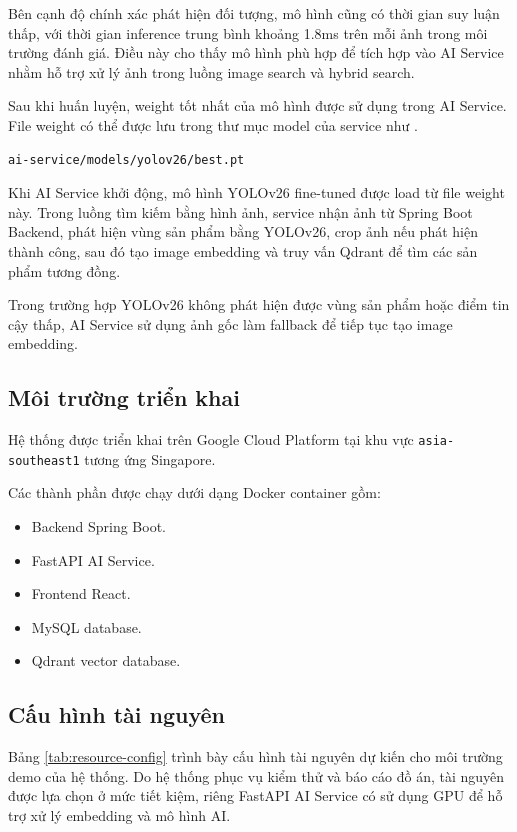 Bên cạnh độ chính xác phát hiện đối tượng, mô hình cũng có thời gian suy luận thấp, với thời gian inference trung bình khoảng 1.8ms trên mỗi ảnh trong môi trường đánh giá. Điều này cho thấy mô hình phù hợp để tích hợp vào AI Service nhằm hỗ trợ xử lý ảnh trong luồng image search và hybrid search.

Sau khi huấn luyện, weight tốt nhất của mô hình được sử dụng trong AI Service. File weight có thể được lưu trong thư mục model của service như .

\begin{lstlisting}[style=terminal,caption={Đường dẫn lưu weight YOLOv26 sau khi fine-tune},label={lst:yolo-weight-path}]
ai-service/models/yolov26/best.pt
\end{lstlisting}

Khi AI Service khởi động, mô hình YOLOv26 fine-tuned được load từ file weight này. Trong luồng tìm kiếm bằng hình ảnh, service nhận ảnh từ Spring Boot Backend, phát hiện vùng sản phẩm bằng YOLOv26, crop ảnh nếu phát hiện thành công, sau đó tạo image embedding và truy vấn Qdrant để tìm các sản phẩm tương đồng.

Trong trường hợp YOLOv26 không phát hiện được vùng sản phẩm hoặc điểm tin cậy thấp, AI Service sử dụng ảnh gốc làm fallback để tiếp tục tạo image embedding. 
\subsection{Môi trường triển khai}

Hệ thống được triển khai trên Google Cloud Platform tại khu vực \texttt{asia-southeast1} tương ứng Singapore.

Các thành phần được chạy dưới dạng Docker container gồm:

\begin{itemize}
    \item Backend Spring Boot.
    \item FastAPI AI Service.
    \item Frontend React.
    \item MySQL database.
    \item Qdrant vector database.
\end{itemize}

\subsection{Cấu hình tài nguyên}

Bảng \ref{tab:resource-config} trình bày cấu hình tài nguyên dự kiến cho môi trường demo của hệ thống. Do hệ thống phục vụ kiểm thử và báo cáo đồ án, tài nguyên được lựa chọn ở mức tiết kiệm, riêng FastAPI AI Service có sử dụng GPU để hỗ trợ xử lý embedding và mô hình AI.

